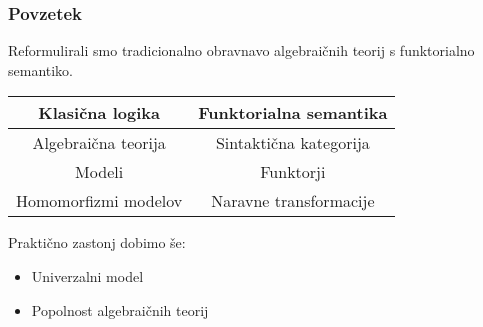 \documentclass{beamer}
\begin{document}
\begin{frame}
\frametitle{Povzetek}
Reformulirali smo tradicionalno obravnavo algebraičnih teorij s funktorialno semantiko.
\vspace{1em}
\begin{center}
\begin{tabular}{c | c}
Klasična logika & Funktorialna semantika \\ [0.7ex]
\hline
Algebraična teorija & Sintaktična kategorija \\ [0.5ex]
Modeli & Funktorji \\ [0.5ex]
Homomorfizmi modelov & Naravne transformacije \\ [0.5ex]
\end{tabular}
\end{center}
\vspace{1em}
Praktično zastonj dobimo še:
\begin{itemize}
\item Univerzalni model
\item Popolnost algebraičnih teorij
\end{itemize}
\end{frame}
\end{document}
